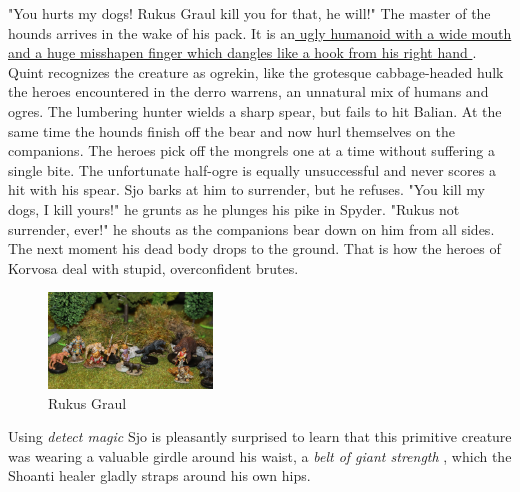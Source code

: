 "You hurts my dogs! Rukus Graul kill you for that, he will!" The master of the hounds arrives in the wake of his pack. It is an\hyperref[fig:Rukus-Graul-504564975]{ ugly humanoid with a wide mouth and a huge misshapen finger which dangles like a hook from his right hand } . Quint recognizes the creature as ogrekin, like the grotesque cabbage-headed hulk the heroes encountered in the derro warrens, an unnatural mix of humans and ogres. The lumbering hunter wields a sharp spear, but fails to hit Balian. At the same time the hounds finish off the bear and now hurl themselves on the companions. The heroes pick off the mongrels one at a time without suffering a single bite. The unfortunate half-ogre is equally unsuccessful and never scores a hit with his spear. Sjo barks at him to surrender, but he refuses. "You kill my dogs, I kill yours!" he grunts as he plunges his pike in Spyder. "Rukus not surrender, ever!" he shouts as the companions bear down on him from all sides. The next moment his dead body drops to the ground. That is how the heroes of Korvosa deal with stupid, overconfident brutes. \\

\begin{figure}[h]
	\centering
	\includegraphics[width=0.39\textwidth]{images/Rukus-Graul-504564975.jpg}
	\caption{Rukus Graul}
	\label{fig:Rukus-Graul-504564975}
\end{figure}

Using {\itshape detect magic} Sjo is pleasantly surprised to learn that this primitive creature was wearing a valuable girdle around his waist, a  {\itshape belt of giant strength} , which the Shoanti healer gladly straps around his own hips. 